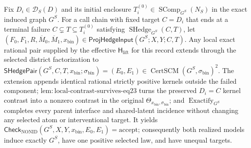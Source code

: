 Fix \(D_i\in\mathcal D_S(D)\) and its initial enclosure \(T_i^{(0)}\in\operatorname{SComp}_{G^S}(N_S)\) in the exact induced graph \(G^S\). For a call chain with fixed target \(C=D_i\) that ends at a terminal failure \(C\subsetneq T\subseteq T_i^{(0)}\) satisfying \(\operatorname{SHedge}_{G^S}(C,T)\), let \((F_0,F_1,R,\overline M_0,\overline M_1,x_{\mathrm{bin}})\in\mathsf{ProjHedgeInput}(G^S;X,Y;C,T)\). Any local exact rational pair supplied by the effective \(\mathsf H_{\mathrm{lift}}\) for this record extends through the selected district factorization to \(\mathsf{SHedgePair}(G^S,C,T,x_{\mathrm{bin}};\sigma_{\mathrm{bin}})=(E_0,E_1)\in\operatorname{CertSCM}(G^S,\sigma_{\mathrm{bin}})^2\). The extension appends identical rational strictly positive kernels outside the failed component; \(\mathrm{lem:local\text{-}contrast\text{-}survives\text{-}eq23}\) turns the preserved \(D_i=C\) kernel contrast into a nonzero contrast in the original \(\Theta_{x_{\mathrm{bin}},\sigma_{\mathrm{bin}}}\); and \(\operatorname{Exactify}_{G^S}\) completes every parent interface and shared-latent incidence without changing any selected atom or interventional target. It yields \(\mathsf{Check}_{\mathrm{NONID}}(G^S,X,Y,x_{\mathrm{bin}},E_0,E_1)=\mathrm{accept}\); consequently both realized models induce exactly \(G^S\), have one positive selected law, and have unequal targets.